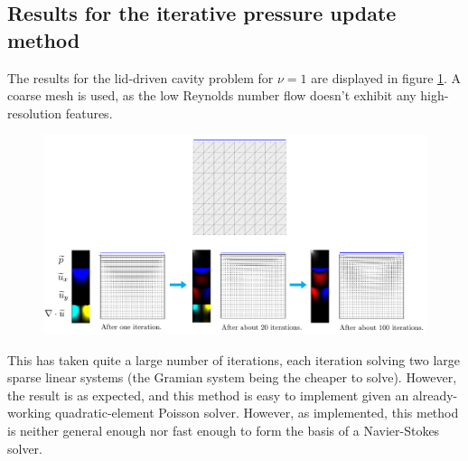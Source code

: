 \subsection{Results for the iterative pressure update method}
The results for the lid-driven cavity problem for $\nu = 1$ are displayed in figure \ref{stokes_lid_driven_weakly_incomprssible}.
A coarse mesh is used, as the low Reynolds number flow doesn't exhibit any high-resolution features.

\begin{figure}[H]
    \centering
    \centerline{\includegraphics[width=1.3\textwidth]{figures/stokes/lid_driven_weakly_incompressible/figure.png}}
    \label{stokes_lid_driven_weakly_incomprssible}
\end{figure}
This has taken quite a large number of iterations, each iteration solving two large sparse linear systems (the Gramian system being the cheaper to solve).
However, the result is as expected, and this method is easy to implement given an already-working quadratic-element Poisson solver.
However, as implemented, this method is neither general enough nor fast enough to form the basis of a Navier-Stokes solver.


